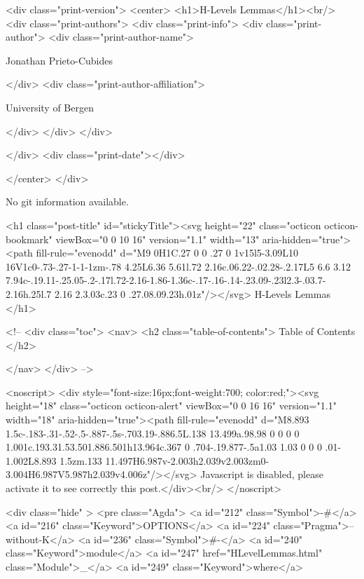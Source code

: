   <div class="print-version">
    <center>
      <h1>H-Levels Lemmas</h1><br/>
        <div class="print-authors">
          <div class="print-info">
            <div class="print-author">
              <div class="print-author-name">
                
                  Jonathan Prieto-Cubides
                
              </div>
              <div class="print-author-affiliation">
                
                  University of Bergen
                
                </div>
            </div>
          </div>
          
          
        </div>
        <div class="print-date"></div>
        
        
    </center>
  </div>

  
  No git information available.
  
  <h1 class="post-title" id="stickyTitle"><svg height="22" class="octicon octicon-bookmark" viewBox="0 0 10 16" version="1.1" width="13" aria-hidden="true"><path fill-rule="evenodd" d="M9 0H1C.27 0 0 .27 0 1v15l5-3.09L10 16V1c0-.73-.27-1-1-1zm-.78 4.25L6.36 5.61l.72 2.16c.06.22-.02.28-.2.17L5 6.6 3.12 7.94c-.19.11-.25.05-.2-.17l.72-2.16-1.86-1.36c-.17-.16-.14-.23.09-.23l2.3-.03.7-2.16h.25l.7 2.16 2.3.03c.23 0 .27.08.09.23h.01z"/></svg> H-Levels Lemmas
  </h1>

  <!-- 
  <div class="toc">
    <nav>
    <h2 class="table-of-contents"> Table of Contents </h2>
      

    </nav>
  </div>
   -->

  <noscript>
  <div style="font-size:16px;font-weight:700; color:red;"><svg height="18" class="octicon octicon-alert" viewBox="0 0 16 16" version="1.1" width="18" aria-hidden="true"><path fill-rule="evenodd" d="M8.893 1.5c-.183-.31-.52-.5-.887-.5s-.703.19-.886.5L.138 13.499a.98.98 0 0 0 0 1.001c.193.31.53.501.886.501h13.964c.367 0 .704-.19.877-.5a1.03 1.03 0 0 0 .01-1.002L8.893 1.5zm.133 11.497H6.987v-2.003h2.039v2.003zm0-3.004H6.987V5.987h2.039v4.006z"/></svg> Javascript is disabled, please activate it to see correctly this post.</div><br/>
  </noscript>

  <div class="hide" >
<pre class="Agda">
<a id="212" class="Symbol">{-#</a> <a id="216" class="Keyword">OPTIONS</a> <a id="224" class="Pragma">--without-K</a> <a id="236" class="Symbol">#-}</a>
<a id="240" class="Keyword">module</a> <a id="247" href="HLevelLemmas.html" class="Module">_</a> <a id="249" class="Keyword">where</a>

